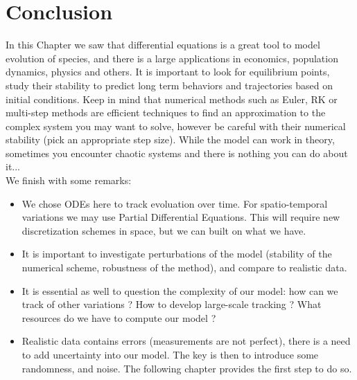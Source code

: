 \section{Conclusion}
In this Chapter  we saw that differential equations is a great tool to model evolution of species, and there is a large applications in economics, population dynamics, physics and others. It is important to look for equilibrium points, study their stability to predict long term behaviors and trajectories based on initial conditions. Keep in mind that numerical methods such as Euler, RK or multi-step methods are efficient techniques to find an approximation to the complex system you may want to solve, however be careful with their numerical stability (pick an appropriate step size). While the model can work in theory, sometimes you encounter chaotic systems and there is nothing you can do about it...\\
We finish with some remarks:
\begin{itemize}
\item We chose ODEs here to track evoluation over time. For spatio-temporal variations we may use Partial Differential Equations. This will require new discretization schemes in space, but we can built on what we have.
\item It is important to investigate perturbations of the model (stability of the numerical scheme, robustness of the method), and compare to realistic data.
\item It is essential as well to question the complexity of our model: how can we track of other variations ? How to develop large-scale tracking ? What resources do we have to compute our model ?
\item Realistic data contains errors (measurements are not perfect), there is a need to add uncertainty into our model. The key is then to introduce some randomness, and noise. The following chapter provides the first step to do so.
\end{itemize}
 
 
 
 
 